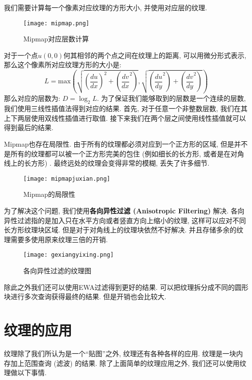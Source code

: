 我们需要计算每一个像素对应纹理的方形大小, 并使用对应层的纹理. 
\begin{figure}[H]
	\centering
	\texttt{[image: mipmap.png]}
	\caption{Mipmap对应层数计算}
	\label{fig:mipmap}
\end{figure}
对于一个点$u(0,0)$何其相邻的两个点之间在纹理上的距离, 可以用微分形式表示, 那么这个像素所对应纹理方形的大小是: 
\begin{equation}
	L= \text{max}(\sqrt{(\frac{du}{dx})^2+(\frac{dv}{dx}^2)},\sqrt{(\frac{du}{dy}^2)+(\frac{dv}{dy}^2)})
\end{equation}
那么对应的层数为: $D=\log_2L$. 
为了保证我们能够取到的层数是一个连续的层数, 我们使用三线性插值法得到对应的结果. 首先, 对于任意一个非整数层数, 我们在其上下两层使用双线性插值进行取值. 接下来我们在两个层之间使用线性插值就可以得到最后的结果. 

Mipmap也存在局限性. 由于所有的纹理都必须对应到一个正方形的区域, 但是并不是所有的纹理都可以被一个正方形完美的包住 (例如细长的长方形, 或者是在对角线上的长方形) . 最终远处的纹理会变得非常的模糊, 丢失了许多细节. 
\begin{figure}[H]
	\centering
	\texttt{[image: mipmapjuxian.png]}
	\caption{Mipmap的局限性}
	\label{fig:mipmapjuxian}
\end{figure}
为了解决这个问题, 我们使用\textbf{各向异性过滤 (Anisotropic Filtering) }解决. 各向异性过滤指的是加入只在水平方向或者竖直方向上缩小的纹理, 这样可以应对不同长方形纹理块区域. 但是对于对角线上的纹理块依然不好解决. 并且存储多余的纹理需要多使用原来纹理三倍的开销. 
\begin{figure}[H]
	\centering
	\texttt{[image: gexiangyixing.png]}
	\caption{各向异性过滤的纹理图}
	\label{fig:gexiangyixing}
\end{figure}
除此之外我们还可以使用EWA过滤得到更好的结果. 可以把纹理拆分成不同的圆形块进行多次查询获得最终的结果. 但是开销也会比较大. 

\section{纹理的应用}
纹理除了我们所认为是一个“贴图”之外, 纹理还有各种各样的应用. 纹理是一块内存加上范围查询 (滤波) 的结果. 除了上面简单的纹理应用之外, 我们还可以使用纹理做以下事情. 

